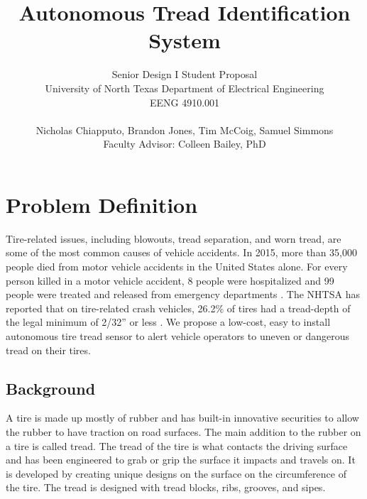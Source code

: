 \documentclass[11pt]{IEEEtran}
\begin{document}
	\title{ Autonomous Tread Identification System }

	\author{	Senior Design I Student Proposal \\
				University of North Texas Department of Electrical Engineering \\
				EENG 4910.001 \\ \\
				Nicholas Chiapputo, Brandon Jones, Tim McCoig, Samuel Simmons \\
				Faculty Advisor: Colleen Bailey, PhD
	}

	\maketitle


	\section{Problem Definition}
		Tire-related issues, including blowouts, tread separation, and worn tread, are some of the most common causes of vehicle accidents. In 2015, more than 35,000 people died from motor vehicle accidents in the United States alone. For every person killed in a motor vehicle accident, 8 people were hospitalized and 99 people were treated and released from emergency departments \cite{cdcKeyStats}. The NHTSA has reported that on tire-related crash vehicles, 26.2\% of tires had a tread-depth of the legal minimum of 2/32'' or less \cite[pp.~8-9]{nhtsaCrashStats}. We propose a low-cost, easy to install autonomous tire tread sensor to alert vehicle operators to uneven or dangerous tread on their tires.

		\subsection{Background}
			A tire is made up mostly of rubber and has built-in innovative securities to allow the rubber to have traction on road surfaces. The main addition to the rubber on a tire is called tread. The tread of the tire is what contacts the driving surface and has been engineered to grab or grip the surface it impacts and travels on. It is developed by creating unique designs on the surface on the circumference of the tire. The tread is designed with tread blocks, ribs, grooves, and sipes.
\end{document}
